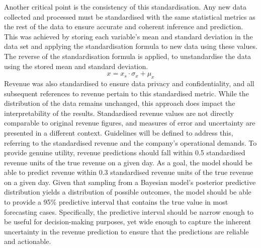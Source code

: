 Another critical point is the consistency of this standardisation. Any new data
collected and processed must be standardised with the same statistical metrics
as the rest of the data to ensure accurate and coherent inference and
prediction. This was achieved by storing each variable's mean and standard
deviation in the data set and applying the standardisation formula to new data
using these values. The reverse of the standardisation formula is applied, to
unstandardise the data using the stored mean and standard deviation. 
\begin{equation}
  x = x_{s} \cdot \sigma_x + \mu_x
\end{equation}
Revenue was also standardised to ensure data privacy and confidentiality, and
all subsequent references to revenue pertain to this standardised metric. While
the distribution of the data remains unchanged, this approach does impact the
interpretability of the results. Standardised revenue values are not
directly comparable to original revenue figures, and measures of error and
uncertainty are presented in a different context. Guidelines will be defined to
address this, referring to the standardised revenue and the company's
operational demands. To provide genuine utility, revenue predictions should
fall within 0.5 standardised revenue units of the true revenue on a given day.
As a goal, the model should be able to predict revenue within 0.3 standardised
revenue units of the true revenue on a given day. Given that sampling from a
Bayesian model's posterior predictive distribution yields a distribution of
possible outcomes, the model should be able to provide a 95\% predictive
interval that contains the true value in most forecasting cases. Specifically,
the predictive interval should be narrow enough to be useful for
decision-making purposes, yet wide enough to capture the inherent uncertainty
in the revenue prediction to ensure that the predictions are reliable and
actionable.

